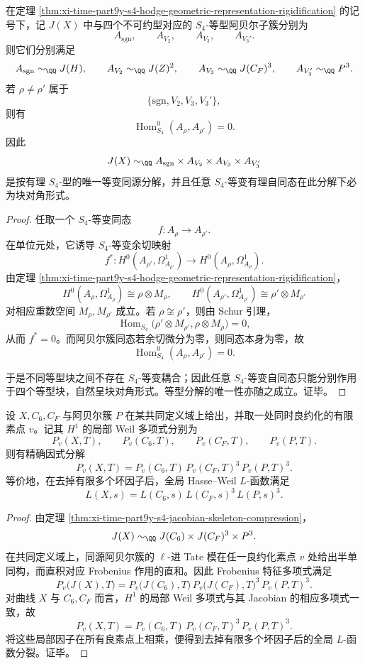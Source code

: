 \begin{corollary}\label{cor:xi-time-part9y-s4-isotypic-orthogonality-uniqueness}
在定理 \ref{thm:xi-time-part9y-s4-hodge-geometric-representation-rigidification} 的记号下，记 \(J(X)\) 中与四个不可约型对应的 \(S_4\)-等型阿贝尔子簇分别为
\[
A_{\mathrm{sgn}},\qquad
A_{V_2},\qquad
A_{V_3},\qquad
A_{V_3'}.
\]
则它们分别满足
\[
A_{\mathrm{sgn}}\sim_{\QQ}J(H),\qquad
A_{V_2}\sim_{\QQ}J(Z)^2,\qquad
A_{V_3}\sim_{\QQ}J(C_F)^3,\qquad
A_{V_3'}\sim_{\QQ}P^3.
\]
若 \(\rho\neq \rho'\) 属于
\[
\{\mathrm{sgn},V_2,V_3,V_3'\},
\]
则有
\[
\operatorname{Hom}_{S_4}^0(A_\rho,A_{\rho'})=0.
\]
因此
\[
J(X)\sim_{\QQ}A_{\mathrm{sgn}}\times A_{V_2}\times A_{V_3}\times A_{V_3'}
\]
是按有理 \(S_4\)-型的唯一等变同源分解，并且任意 \(S_4\)-等变有理自同态在此分解下必为块对角形式。
\end{corollary}
\begin{proof}
任取一个 \(S_4\)-等变同态
\[
f:A_{\rho}\longrightarrow A_{\rho'}.
\]
在单位元处，它诱导 \(S_4\)-等变余切映射
\[
f^\ast:H^0(A_{\rho'},\Omega_{A_{\rho'}}^1)\longrightarrow H^0(A_{\rho},\Omega_{A_{\rho}}^1).
\]
由定理 \ref{thm:xi-time-part9y-s4-hodge-geometric-representation-rigidification}，
\[
H^0(A_{\rho},\Omega_{A_{\rho}}^1)\cong \rho\otimes M_\rho,
\qquad
H^0(A_{\rho'},\Omega_{A_{\rho'}}^1)\cong \rho'\otimes M_{\rho'}
\]
对相应重数空间 \(M_\rho,M_{\rho'}\) 成立。若 \(\rho\not\cong \rho'\)，则由 Schur 引理，
\[
\operatorname{Hom}_{S_4}\!\bigl(\rho'\otimes M_{\rho'},\rho\otimes M_\rho\bigr)=0,
\]
从而 \(f^\ast=0\)。而阿贝尔簇同态若余切微分为零，则同态本身为零，故
\[
\operatorname{Hom}_{S_4}^0(A_\rho,A_{\rho'})=0.
\]

于是不同等型块之间不存在 \(S_4\)-等变耦合；因此任意 \(S_4\)-等变自同态只能分别作用于四个等型块，自然呈块对角形式。等型分解的唯一性亦随之成立。证毕。
\end{proof}

\begin{theorem}\label{thm:xi-time-part9y-s4-local-lfactor-skeleton-splitting}
设 \(X,C_6,C_F\) 与阿贝尔簇 \(P\) 在某共同定义域上给出，并取一处同时良约化的有限素点 \(v\)。记其 \(H^1\) 的局部 Weil 多项式分别为
\[
P_v(X,T),\qquad
P_v(C_6,T),\qquad
P_v(C_F,T),\qquad
P_v(P,T).
\]
则有精确因式分解
\[
P_v(X,T)=P_v(C_6,T)\,P_v(C_F,T)^3\,P_v(P,T)^3.
\]
等价地，在去掉有限多个坏因子后，全局 Hasse--Weil \(L\)-函数满足
\[
L(X,s)=L(C_6,s)\,L(C_F,s)^3\,L(P,s)^3.
\]
\end{theorem}
\begin{proof}
由定理 \ref{thm:xi-time-part9y-s4-jacobian-skeleton-compression}，
\[
J(X)\sim_{\QQ}J(C_6)\times J(C_F)^3\times P^3.
\]
在共同定义域上，同源阿贝尔簇的 \(\ell\)-进 Tate 模在任一良约化素点 \(v\) 处给出半单同构，而直积对应 Frobenius 作用的直和。因此 Frobenius 特征多项式满足
\[
P_v\!\bigl(J(X),T\bigr)
=
P_v\!\bigl(J(C_6),T\bigr)\,
P_v\!\bigl(J(C_F),T\bigr)^3\,
P_v(P,T)^3.
\]
对曲线 \(X\) 与 \(C_6,C_F\) 而言，\(H^1\) 的局部 Weil 多项式与其 Jacobian 的相应多项式一致，故
\[
P_v(X,T)=P_v(C_6,T)\,P_v(C_F,T)^3\,P_v(P,T)^3.
\]
将这些局部因子在所有良素点上相乘，便得到去掉有限多个坏因子后的全局 \(L\)-函数分裂。证毕。
\end{proof}

